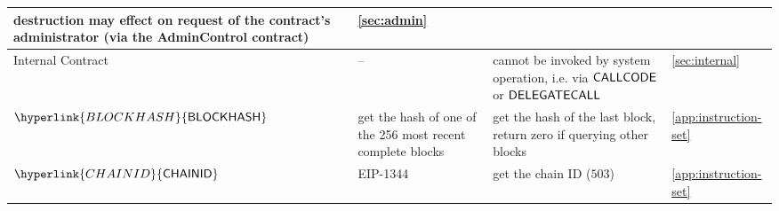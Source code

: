 \documentclass[fleqn,10pt]{SelfArx} %
\begin{document}
\begin{center}
\begin{tabu}{l X X l}
			destruction may effect on request of the contract's administrator
			(via the AdminControl contract) & \cref{sec:admin}\\
			\midrule
			Internal Contract & -- & cannot be invoked by system operation, i.e. via $\mathsf{CALLCODE}$ or $\mathsf{DELEGATECALL}$  
			& \cref{sec:internal} \smallskip\\
			\hline
			$\hyperlink{BLOCKHASH}{\op{BLOCKHASH}}$ 	&  get the hash of one of the 256 most recent complete blocks	& get the hash of the last block, return zero if querying other blocks	& \cref{app:instruction-set}\\
			\hline
			$\hyperlink{CHAINID}{\op{CHAINID}}$ 	& EIP-1344	&  get the {\name} chain ID ($503$)	&  \cref{app:instruction-set}\\
			\bottomrule

	\end{tabu}
\end{center}
\end{document}
